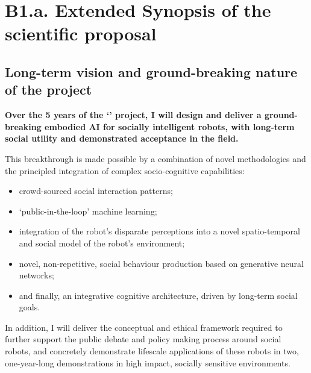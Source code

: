 
\newrefsection


\chapter{B1.a. Extended Synopsis of the scientific proposal}\label{part1}



\section{Long-term vision and ground-breaking nature of the project}

\begin{framed}

\noindent\bf Over the 5 years of the `\project' project, I will design and deliver a ground-breaking embodied AI for
socially intelligent robots, with long-term social utility and demonstrated
    acceptance in the field.

\vspace{0.3em}
\noindent This breakthrough is made possible by a combination of novel methodologies and
the principled integration of complex socio-cognitive capabilities:

\begin{itemize}
        \item crowd-sourced social interaction patterns;
        \item `public-in-the-loop' machine learning;
        \item integration of the robot's disparate perceptions into a novel
            spatio-temporal and social model of the robot's environment;
        \item novel, non-repetitive, social behaviour production based on
            generative neural networks;
        \item and finally, an integrative cognitive architecture, driven by
            long-term social goals.
\end{itemize}

\vspace{0.3em}
\noindent In addition, I will deliver the conceptual and ethical framework required to
further support the public debate and policy making process around social
robots, and concretely demonstrate lifescale applications of these robots in
two, one-year-long demonstrations in high impact, socially sensitive environments.

\end{framed}


